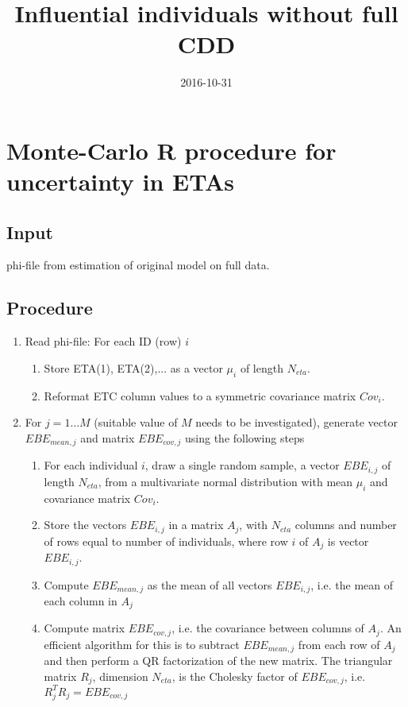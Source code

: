 \documentclass{article}
\title{Influential individuals without full CDD}
\date{2016-10-31}
\begin{document}
\maketitle

\section*{Monte-Carlo R procedure for uncertainty in ETAs}
\subsection*{Input} phi-file from estimation of original model on full data.
\subsection*{Procedure}
\begin{enumerate}
\item Read phi-file: For each ID (row) $i$
\begin{enumerate}
\item Store ETA(1), ETA(2),... as a vector $\mu_{i}$ of length $N_{eta}$.
\item Reformat ETC column values to a symmetric covariance matrix $Cov_i$. 
\end{enumerate}
\item For $j=1\ldots M$ (suitable value of $M$ needs to be investigated), generate vector $EBE_{mean,j}$
  and matrix $EBE_{cov,j}$ using the following steps
\begin{enumerate}
\item For each individual $i$, draw a single random sample, a vector $EBE_{i,j}$ of length $N_{eta}$,
  from a multivariate normal distribution with mean $\mu_{i}$
  and covariance matrix $Cov_i$.
\item Store the vectors $EBE_{i,j}$ in a matrix $A_j$, with $N_{eta}$ columns and number of
  rows equal to number of individuals, where row $i$ of $A_j$ is vector $EBE_{i,j}$. 
\item Compute $EBE_{mean,j}$ as the mean of all vectors $EBE_{i,j}$, i.e. the mean of each column in $A_{j}$
\item Compute matrix $EBE_{cov,j}$, i.e. the covariance between columns of $A_{j}$. An efficient
  algorithm for this is to subtract $EBE_{mean,j}$ from each row of $A_{j}$ and then perform a QR
  factorization of the new matrix. The triangular matrix $R_j$, dimension $N_{eta}$, is the Cholesky factor
  of $EBE_{cov,j}$, i.e. $R_j^TR_j=EBE_{cov,j}$
\end{enumerate}

\end{enumerate}
\end{document}
